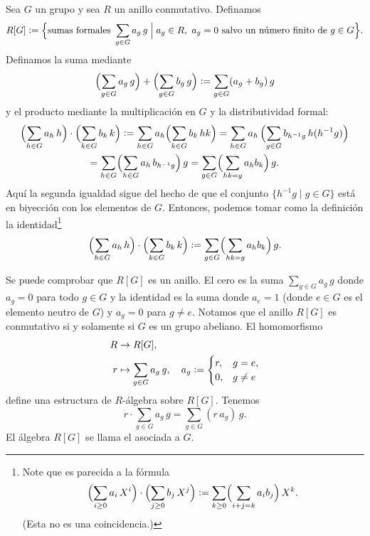 \begin{definicion}
  Sea $G$ un grupo y sea $R$ un anillo
  conmutativo. Definamos
  \[ R [G] \mathrel{\mathop:}=
     \Bigl\{ \text{sumas formales }\sum_{g\in G} a_g\,g \Bigm|
             a_g\in R, ~ a_g = 0
             \text{ salvo un número finito de }g\in G \Bigr\}. \]
  Definamos la suma mediante
  \[ \Bigl(\sum_{g\in G} a_g\,g\Bigr) + \Bigl(\sum_{g\in G} b_g\,g\Bigr) \mathrel{\mathop:}=
     \sum_{g\in G} (a_g+b_g)\,g \]
  y el producto mediante la multiplicación en $G$ y la distributividad formal:
  \begin{multline*}
    \Bigl(\sum_{h\in G} a_h\,h\Bigr) \cdot \Bigl(\sum_{k\in G} b_k\,k\Bigr) \mathrel{\mathop:}= \sum_{h\in G} a_h \Bigl( \sum_{k\in G} b_k\,hk\Bigr) =
    \sum_{h\in G} a_h \, \Bigl( \sum_{g\in G} b_{h^{-1}g}\,h (h^{-1} g)\Bigr) \\
    = \sum_{h\in G} \Bigl(\sum_{h\in G} a_h\,b_{h^{-1}g}\Bigr)\,g =
    \sum_{g\in G} \Bigl(\sum_{hk = g} a_h b_k\Bigr)\,g.
  \end{multline*}
  Aquí la segunda igualdad sigue del hecho de que el conjunto
  $\{ h^{-1} g \mid g\in G \}$ está en biyección con los elementos
  de $G$. Entonces, podemos tomar como la definición la
  identidad\footnote{Note que es parecida a la fórmula
    \[ \Bigl(\sum_{i\ge 0} a_i\,X^i\Bigr) \cdot \Bigl(\sum_{j \ge 0} b_j\,X^j\Bigr) \mathrel{\mathop:}=
      \sum_{k\ge 0} \Bigl(\sum_{i + j = k} a_i b_j\Bigr)\,X^k. \]
    (Esta no es una coincidencia.)}
  \[ \Bigl(\sum_{h\in G} a_h\,h\Bigr) \cdot \Bigl(\sum_{k\in G} b_k\,k\Bigr) \mathrel{\mathop:}=
     \sum_{g\in G} \Bigl(\sum_{hk = g} a_h b_k\Bigr)\,g. \]

  Se puede comprobar que $R [G]$ es un anillo. El cero es la suma
  $\sum_{g\in G} a_g\,g$ donde $a_g = 0$ para todo $g\in G$ y la identidad
  es la suma donde $a_e = 1$ (donde $e\in G$ es el elemento neutro de $G$)
  y $a_g = 0$ para $g\ne e$. Notamos que el anillo $R [G]$ es conmutativo
  si y solamente si $G$ es un grupo abeliano. El homomorfismo
  \begin{align*}
    R & \to R [G],\\
    r & \mapsto \sum_{g\in G} a_g\,g, \quad a_g \mathrel{\mathop:}= \begin{cases}
      r, & g = e,\\
      0, & g \ne e
    \end{cases}
  \end{align*}
  define una estructura de $R$-álgebra sobre $R [G]$. Tenemos
  $$r\cdot \sum_{g\in G} a_g\,g = \sum_{g\in G} (r\,a_g)\,g.$$
  El álgebra $R [G]$ se llama el 
  asociada a $G$.
\end{definicion}

